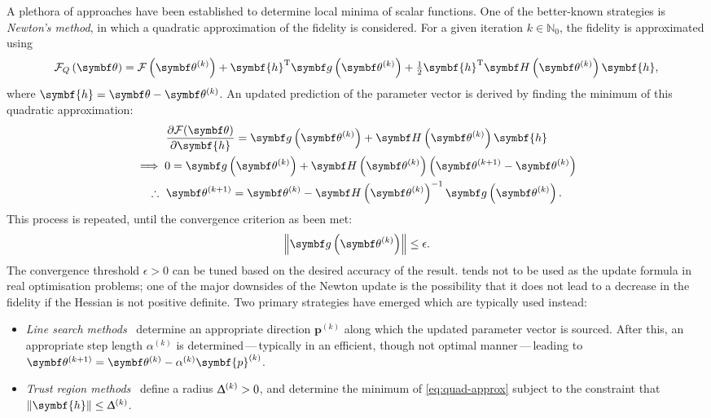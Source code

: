 A plethora of approaches have been established to determine local minima of
scalar functions. One of the better-known strategies is \emph{Newton's method},
in which a quadratic approximation of the fidelity is considered.
For a given iteration $k \in \mathbb{N}_0$, the fidelity is approximated using
\begin{equation}
    \FQth =
        \Fthk +
        \symbf{h}\T \bdgthk +
        \tfrac{1}{2} \symbf{h}^{\mathrm{T}} \bdHthk \symbf{h},
    \label{eq:quad-approx}
\end{equation}
where $\symbf{h} = \bth - \bthk$.  An updated prediction of the parameter
vector is derived by finding the minimum of this quadratic approximation:
\begin{gather}
    \frac{\partial \Fth}{\partial \symbf{h}} =
        \bdgthk + \bdHthk \symbf{h} \notag\\
    \implies 0 = \bdgthk + \bdHthk \left(\bthkplusone - \bthk\right) \notag\\
    \therefore\ \bthkplusone =
        \bthk - \bdHthk^{-1}
        \bdgthk.\label{eq:newton-update}
\end{gather}
This process is repeated, until the convergence criterion as been met:
\begin{equation}
    \left\lVert \bdgthk \right\rVert \leq \epsilon.
\end{equation}
The convergence threshold $\epsilon > 0$ can be tuned based on the desired
accuracy of the result.
 tends not to be used as the update formula in real
optimisation problems; one of the major downsides of the Newton update is the
possibility that it does not lead to a decrease in the fidelity if the Hessian
is not positive definite. Two primary strategies have emerged which are
typically used instead:
\begin{itemize}
    \item \emph{Line search methods}~\cite[Chapter 3]{Nocedal2006} determine an
        appropriate direction $\symbf{p}^{(k)}$ along which the updated
        parameter vector is sourced.  After this, an appropriate step length
        $\alpha^{(k)}$ is determined\,---\,typically in an efficient, though not
        optimal manner\,---\,leading to $\bthkplusone = \bthk - \alpha^{(k)}\symbf{p}^{(k)}$.
    \item \emph{Trust region methods}~\cite[Chapter 4]{Nocedal2006} define a
        radius $\Updelta^{(k)} > 0$, and determine the minimum of
        \cref{eq:quad-approx} subject to the constraint that
        $\left\lVert\symbf{h}\right\rVert \leq \Updelta^{(k)}$.
\end{itemize}


